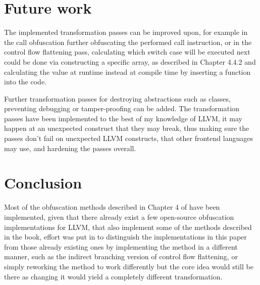 \section{Future work}

The implemented transformation passes can be improved upon, for example in the call obfuscation further obfuscating
the performed call instruction, or in the control flow flattening pass, calculating which switch case will be executed
next could be done via constructing a specific array, as described in Chapter 4.4.2 \cite{ss-chpt4} and calculating the value at runtime instead at compile time by
inserting a function into the code.

Further transformation passes for destroying abstractions such as classes, preventing debugging or tamper-proofing can be added.
The transformation passes have been implemented to the best of my knowledge of LLVM, it may happen at an unexpected construct that they may break, thus
making sure the passes don't fail on unexpected LLVM constructs, that other frontend languages may use, and hardening the passes overall.

\section{Conclusion}
Most of the obfuscation methods described in Chapter 4 of \cite{serr-soft} have been implemented, given that there already exist a few open-source obfuscation implementations
for LLVM, that also implement some of the methods described in the book, effort was put in to distinguish the implementations in this paper from those already existing ones
by implementing the method in a different manner, such as the indirect branching version of control flow flattening, or simply reworking the method to work differently but the
core idea would still be there as changing it would yield a completely different transformation.

